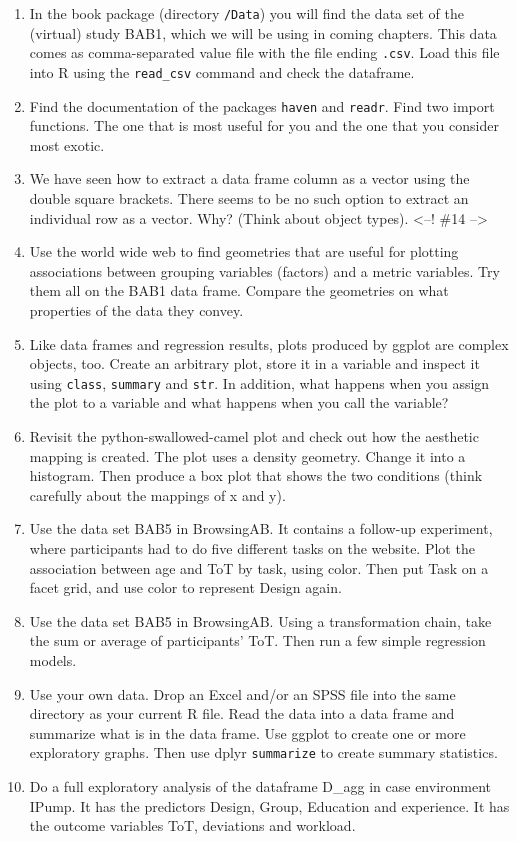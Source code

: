 \documentclass[]{svmono}
\theoremstyle{definition}
\theoremstyle{definition}
\theoremstyle{definition}
\theoremstyle{remark}
\begin{document}
\begin{enumerate}
\def\labelenumi{\arabic{enumi}.}
\item
  In the book package (directory \texttt{/Data}) you will find the data
  set of the (virtual) study BAB1, which we will be using in coming
  chapters. This data comes as comma-separated value file with the file
  ending \texttt{.csv}. Load this file into R using the
  \texttt{read\_csv} command and check the dataframe.
\item
  Find the documentation of the packages \texttt{haven} and
  \texttt{readr}. Find two import functions. The one that is most useful
  for you and the one that you consider most exotic.
\item
  We have seen how to extract a data frame column as a vector using the
  double square brackets. There seems to be no such option to extract an
  individual row as a vector. Why? (Think about object types).
  \textless{}--! \#14 --\textgreater{}
\item
  Use the world wide web to find geometries that are useful for plotting
  associations between grouping variables (factors) and a metric
  variables. Try them all on the BAB1 data frame. Compare the geometries
  on what properties of the data they convey.
\item
  Like data frames and regression results, plots produced by ggplot are
  complex objects, too. Create an arbitrary plot, store it in a variable
  and inspect it using \texttt{class}, \texttt{summary} and
  \texttt{str}. In addition, what happens when you assign the plot to a
  variable and what happens when you call the variable?
\item
  Revisit the python-swallowed-camel plot and check out how the
  aesthetic mapping is created. The plot uses a density geometry. Change
  it into a histogram. Then produce a box plot that shows the two
  conditions (think carefully about the mappings of x and y).
\item
  Use the data set BAB5 in BrowsingAB. It contains a follow-up
  experiment, where participants had to do five different tasks on the
  website. Plot the association between age and ToT by task, using
  color. Then put Task on a facet grid, and use color to represent
  Design again.
\item
  Use the data set BAB5 in BrowsingAB. Using a transformation chain,
  take the sum or average of participants' ToT. Then run a few simple
  regression models.
\item
  Use your own data. Drop an Excel and/or an SPSS file into the same
  directory as your current R file. Read the data into a data frame and
  summarize what is in the data frame. Use ggplot to create one or more
  exploratory graphs. Then use dplyr \texttt{summarize} to create
  summary statistics.
\item
  Do a full exploratory analysis of the dataframe D\_agg in case
  environment IPump. It has the predictors Design, Group, Education and
  experience. It has the outcome variables ToT, deviations and workload.


\end{enumerate}
\end{document}
